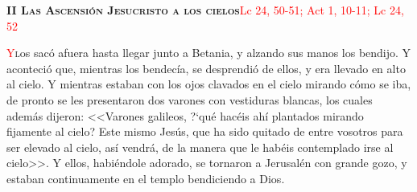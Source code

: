 \noindent\textbf{\textsc{II Las Ascensión Jesucristo a los cielos}}\hfill\textcolor{red}{Lc 24, 50-51; Act 1, 10-11; Lc 24, 52 }

\vspace{0.25em}

\lettrine[lines=2]{\textcolor{red}{Y}} los sacó afuera hasta llegar junto a Betania, y alzando sus manos los bendijo. Y aconteció que, mientras
los bendecía, se desprendió de ellos, y era llevado en alto al cielo. Y mientras estaban con los ojos clavados en el cielo mirando cómo se iba,
de pronto se les presentaron dos varones con vestiduras blancas, los cuales además dijeron: <<Varones galileos, {?`}qué hacéis ahí plantados
mirando fijamente al cielo? Este mismo Jesús, que ha sido quitado de entre vosotros para ser elevado al cielo, así vendrá, de la manera que
le habéis contemplado irse al cielo>>. Y ellos, habiéndole adorado, se tornaron a Jerusalén con grande gozo, y estaban continuamente en 
el templo bendiciendo a Dios.